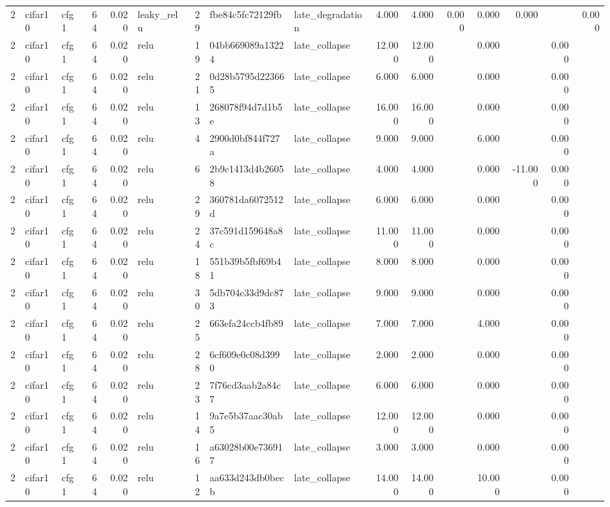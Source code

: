 \begin{table}[htbp]
{\begin{tabular}{@{}rllrrlrllrrrrrrr@{}}
2 & cifar10 & cfg1 & 64 & 0.020 & leaky\_relu & 29 & fbe84c5fc72129fb & late\_degradation & 4.000 & 4.000 & 0.000 & 0.000 & 0.000 &  & 0.000 \\
2 & cifar10 & cfg1 & 64 & 0.020 & relu & 19 & 04bb669089a13224 & late\_collapse & 12.000 & 12.000 &  & 0.000 &  & 0.000 &  \\
2 & cifar10 & cfg1 & 64 & 0.020 & relu & 21 & 0d28b5795d223665 & late\_collapse & 6.000 & 6.000 &  & 0.000 &  & 0.000 &  \\
2 & cifar10 & cfg1 & 64 & 0.020 & relu & 13 & 268078f94d7d1b5e & late\_collapse & 16.000 & 16.000 &  & 0.000 &  & 0.000 &  \\
2 & cifar10 & cfg1 & 64 & 0.020 & relu & 4 & 2900d0bf844f727a & late\_collapse & 9.000 & 9.000 &  & 6.000 &  & 0.000 &  \\
2 & cifar10 & cfg1 & 64 & 0.020 & relu & 6 & 2b9c1413d4b26058 & late\_collapse & 4.000 & 4.000 &  & 0.000 & -11.000 & 0.000 &  \\
2 & cifar10 & cfg1 & 64 & 0.020 & relu & 29 & 360781da6072512d & late\_collapse & 6.000 & 6.000 &  & 0.000 &  & 0.000 &  \\
2 & cifar10 & cfg1 & 64 & 0.020 & relu & 24 & 37c591d159648a8c & late\_collapse & 11.000 & 11.000 &  & 0.000 &  & 0.000 &  \\
2 & cifar10 & cfg1 & 64 & 0.020 & relu & 18 & 551b39b5fbf69b41 & late\_collapse & 8.000 & 8.000 &  & 0.000 &  & 0.000 &  \\
2 & cifar10 & cfg1 & 64 & 0.020 & relu & 30 & 5db704c33d9dc873 & late\_collapse & 9.000 & 9.000 &  & 0.000 &  & 0.000 &  \\
2 & cifar10 & cfg1 & 64 & 0.020 & relu & 25 & 663efa24ccb4fb89 & late\_collapse & 7.000 & 7.000 &  & 4.000 &  & 0.000 &  \\
2 & cifar10 & cfg1 & 64 & 0.020 & relu & 28 & 6cf609e0c08d3990 & late\_collapse & 2.000 & 2.000 &  & 0.000 &  & 0.000 &  \\
2 & cifar10 & cfg1 & 64 & 0.020 & relu & 23 & 7f76cd3aab2a84c7 & late\_collapse & 6.000 & 6.000 &  & 0.000 &  & 0.000 &  \\
2 & cifar10 & cfg1 & 64 & 0.020 & relu & 14 & 9a7e5b37aac30ab5 & late\_collapse & 12.000 & 12.000 &  & 0.000 &  & 0.000 &  \\
2 & cifar10 & cfg1 & 64 & 0.020 & relu & 16 & a63028b00e736917 & late\_collapse & 3.000 & 3.000 &  & 0.000 &  & 0.000 &  \\
2 & cifar10 & cfg1 & 64 & 0.020 & relu & 12 & aa633d243db0becb & late\_collapse & 14.000 & 14.000 &  & 10.000 &  & 0.000 &  \\

\end{tabular}}
\end{table}
